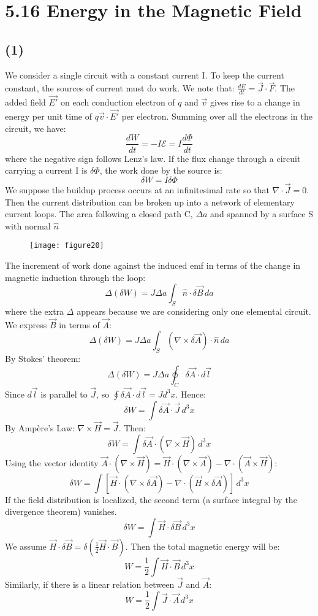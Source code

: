 \documentclass{article}
\begin{document}
	\newpage
	
	\section*{5.16 Energy in the Magnetic Field}
	\subsection*{(1)}
	We consider a single circuit with a constant current I. To keep the current constant, the sources of current must do work. We note that: $\frac{dE}{dt} = \vec{J} \cdot \vec{F}$. The added field $\vec{E'}$ on each conduction electron of $q$ and $\vec{v}$ gives rise to a change in energy per unit time of $q\vec{v} \cdot \vec{E'}$ per electron. Summing over all the electrons in the circuit, we have:
	$$ \frac{dW}{dt} = -I \mathcal{E} = I \frac{d\Phi}{dt} $$
	where the negative sign follows Lenz's law. If the flux change through a circuit carrying a current I is $\delta\Phi$, the work done by the source is:
	$$ \delta W = I \delta\Phi $$
	We suppose the buildup process occurs at an infinitesimal rate so that $\nabla \cdot \vec{J} = 0$. Then the current distribution can be broken up into a network of elementary current loops. The area following a closed path C, $\Delta a$ and spanned by a surface S with normal $\hat{n}$ 
	
	\begin{figure}[h]
		\centering
		\texttt{[image: figure20]}
		\caption{}
		\label{fig:figure20}
	\end{figure}
	
	The increment of work done against the induced emf in terms of the change in magnetic induction through the loop:
	$$ \Delta(\delta W) = J \Delta a \int_S \hat{n} \cdot \delta\vec{B} \, da $$
	where the extra $\Delta$ appears because we are considering only one elemental circuit. We express $\vec{B}$ in terms of $\vec{A}$:
	$$ \Delta(\delta W) = J \Delta a \int_S (\nabla \times \delta\vec{A}) \cdot \hat{n} \, da $$
	By Stokes' theorem:
	$$ \Delta(\delta W) = J \Delta a \oint_C \delta\vec{A} \cdot d\vec{l} $$
	Since $d\vec{l}$ is parallel to $\vec{J}$, so $\oint \delta\vec{A} \cdot d\vec{l} = J d^3x$. Hence:
	$$ \delta W = \int \delta\vec{A} \cdot \vec{J} \, d^3x $$
	By Ampère's Law: $\nabla \times \vec{H} = \vec{J}$. Then:
	$$ \delta W = \int \delta\vec{A} \cdot (\nabla \times \vec{H}) \, d^3x $$
	Using the vector identity $\vec{A} \cdot (\nabla \times \vec{H}) = \vec{H} \cdot (\nabla \times \vec{A}) - \nabla \cdot (\vec{A} \times \vec{H})$:
	$$ \delta W = \int [\vec{H} \cdot (\nabla \times \delta\vec{A}) - \nabla \cdot (\vec{H} \times \delta\vec{A})] \, d^3x $$
	If the field distribution is localized, the second term (a surface integral by the divergence theorem) vanishes.
	$$ \delta W = \int \vec{H} \cdot \delta\vec{B} \, d^3x $$
	We assume $\vec{H} \cdot \delta\vec{B} = \delta(\frac{1}{2} \vec{H} \cdot \vec{B})$. Then the total magnetic energy will be:
	$$ W = \frac{1}{2} \int \vec{H} \cdot \vec{B} \, d^3x $$
	Similarly, if there is a linear relation between $\vec{J}$ and $\vec{A}$:
	$$ W = \frac{1}{2} \int \vec{J} \cdot \vec{A} \, d^3x $$
	
\end{document}
